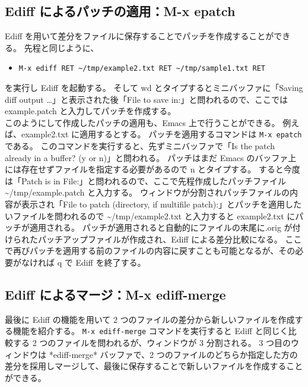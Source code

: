 \subsection{Ediff によるパッチの適用：M-x epatch}
Ediff を用いて差分をファイルに保存することでパッチを作成することができる。
先程と同じように、
\begin{itemize}\setlength{\leftskip}{-1.00zw}%
\item[] \texttt{M-x ediff RET \textasciitilde{}/tmp/example2.txt RET \textasciitilde{}/tmp/sample1.txt RET}
\end{itemize}
を実行し Ediff を起動する。
そして wd とタイプするとミニバッファに「Saving diff output \ldots」と表示された後「File to save in:」と問われるので、ここでは example.patch と入力してパッチを作成する。\\

このようにして作成したパッチの適用も、Emacs 上で行うことができる。
例えば、example2.txt に適用するとする。
パッチを適用するコマンドは \texttt{M-x epatch} である。
このコマンドを実行すると、先ずミニバッファで「Is the patch already in a buffer? (y or n)」と問われる。
パッチはまだ Emacs のバッファ上には存在せずファイルを指定する必要があるので n とタイプする。
すると今度は「Patch is in File:」と問われるので、ここで先程作成したパッチファイル \textasciitilde{}/tmp/example.patch と入力する。
ウィンドウが分割されパッチファイルの内容が表示され「File to patch (directory, if multifile patch):」とパッチを適用したいファイルを問われるので \textasciitilde{}/tmp/example2.txt と入力すると example2.txt にパッチが適用される。
パッチが適用されると自動的にファイルの末尾に.orig が付けられたパッチアップファイルが作成され、Ediff による差分比較になる。
ここで再びパッチを適用する前のファイルの内容に戻すことも可能となるが、その必要がなければ q で Ediff を終了する。
\subsection{Ediff によるマージ：M-x ediff-merge}
最後に Ediff の機能を用いて 2 つのファイルの差分から新しいファイルを作成する機能を紹介する。
\texttt{M-x ediff-merge} コマンドを実行すると Ediff と同じく比較する 2 つのファイルを問われるが、ウィンドウが 3 分割される。
3 つ目のウィンドウは *ediff-merge* バッファで、2 つのファイルのどちらか指定した方の差分を採用しマージして、最後に保存することで新しいファイルを作成することができる。\\

